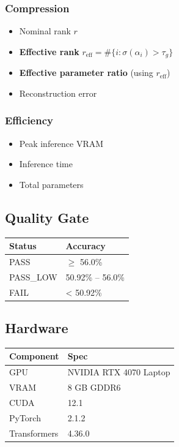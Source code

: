 \subsubsection{Compression}
\begin{itemize}
\item Nominal rank $r$
\item \textbf{Effective rank} $r_\text{eff} = \#\{i : \sigma(\alpha_i) > \tau_g\}$
\item \textbf{Effective parameter ratio} (using $r_\text{eff}$)
\item Reconstruction error

\end{itemize}
\subsubsection{Efficiency}
\begin{itemize}
\item Peak inference VRAM
\item Inference time
\item Total parameters

\end{itemize}
\subsection{Quality Gate}

\begin{table}[H]
\centering
\small
\begin{tabular}{ll}
\toprule
\textbf{Status} & \textbf{Accuracy} \\
\midrule
PASS & $\ge$ 56.0\% \\
PASS\_LOW & 50.92\% -- 56.0\% \\
FAIL & < 50.92\% \\
\bottomrule
\end{tabular}
\end{table}

\subsection{Hardware}

\begin{table}[H]
\centering
\small
\begin{tabular}{ll}
\toprule
\textbf{Component} & \textbf{Spec} \\
\midrule
GPU & NVIDIA RTX 4070 Laptop \\
VRAM & 8 GB GDDR6 \\
CUDA & 12.1 \\
PyTorch & 2.1.2 \\
Transformers & 4.36.0 \\
\bottomrule
\end{tabular}
\end{table}

